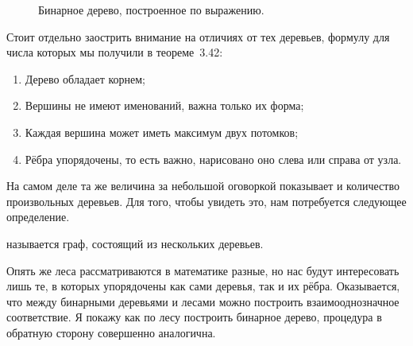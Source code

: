 \begin{figure}[h]
\centering
{}
\caption{Бинарное дерево, построенное по выражению.}
\end{figure}

Стоит отдельно заострить внимание на отличиях от тех деревьев, формулу для числа которых мы получили в теореме~3.42:
\begin{enumerate}
\item Дерево обладает корнем;
\item Вершины не имеют именований, важна только их форма;
\item Каждая вершина может иметь максимум двух потомков;
\item Рёбра упорядочены, то есть важно, нарисовано оно слева или справа от узла.
\end{enumerate}

На самом деле та же величина за небольшой оговоркой показывает и количество произвольных деревьев. Для того, чтобы увидеть это, нам потребуется следующее определение.

\begin{definition}
 называется граф, состоящий из нескольких деревьев.
\end{definition}

Опять же леса рассматриваются в математике разные, но нас будут интересовать лишь те, в которых упорядочены как сами деревья, так и их рёбра. Оказывается, что между бинарными деревьями и лесами можно построить взаимооднозначное соответствие. Я покажу как по лесу построить бинарное дерево, процедура в обратную сторону совершенно аналогична.

